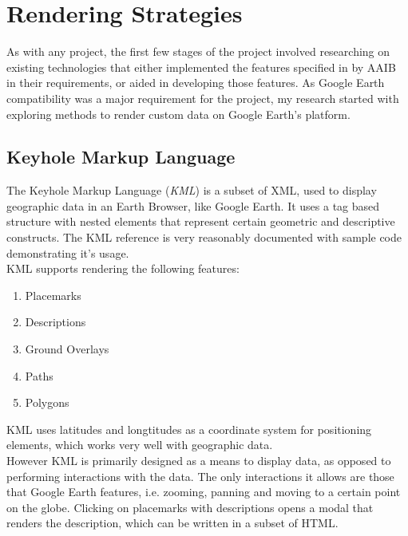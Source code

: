 
\chapter{Rendering Strategies} %

\label{ch:rendering strategies} %

As with any project, the first few stages of the project involved researching on existing technologies that either implemented the features specified in by AAIB in their requirements, or aided in developing those features. As Google Earth compatibility was a major requirement for the project, my research started with exploring
methods to render custom data on Google Earth's platform.


\section{Keyhole Markup Language}

The Keyhole Markup Language (\emph{KML}) is a subset of XML, used to display geographic data in an Earth Browser, like Google Earth. It uses a tag based structure with nested elements that represent certain geometric
and descriptive constructs. The KML reference is very reasonably documented with sample code demonstrating it's usage.\\

KML supports rendering the following features:
\begin{enumerate}
  \item Placemarks
  \item Descriptions
  \item Ground Overlays
  \item Paths
  \item Polygons
\end{enumerate}

KML uses latitudes and longtitudes as a coordinate system for positioning elements, which works very well with geographic data. \\
However KML is primarily designed as a means to display data, as opposed to performing interactions with the data. The only interactions it allows are those that Google Earth features, i.e. zooming, panning and moving to a certain point on the globe. Clicking on placemarks with descriptions opens a modal that renders the description, which can be written in a subset of HTML. \\

